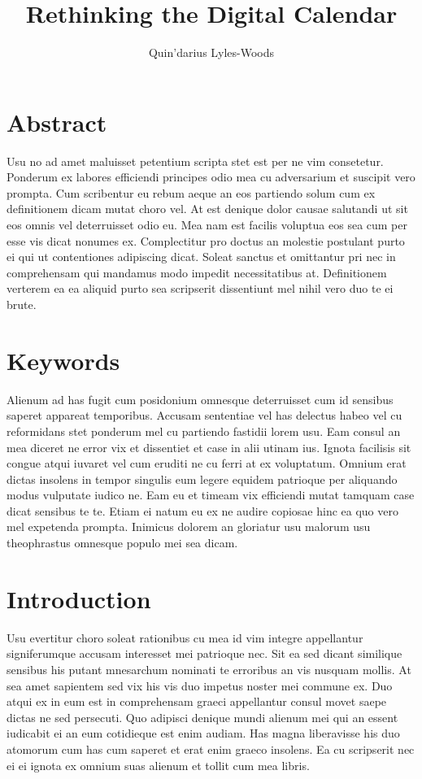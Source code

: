 \documentclass[twocolumn]{report}
\begin{document}
\title{Rethinking the Digital Calendar}
\author{Quin'darius Lyles-Woods}
\section*{Abstract}
Usu no ad amet maluisset petentium scripta stet est per ne vim consetetur. Ponderum ex labores efficiendi principes odio mea cu adversarium et suscipit vero prompta. Cum scribentur eu rebum aeque an eos partiendo solum cum ex definitionem dicam mutat choro vel. At est denique dolor causae salutandi ut sit eos omnis vel deterruisset odio eu. Mea nam est facilis voluptua eos sea cum per esse vis dicat nonumes ex. Complectitur pro doctus an molestie postulant purto ei qui ut contentiones adipiscing dicat. Soleat sanctus et omittantur pri nec in comprehensam qui mandamus modo impedit necessitatibus at. Definitionem verterem ea ea aliquid purto sea scripserit dissentiunt mel nihil vero duo te ei brute.
\section*{\small Keywords}
Alienum ad has fugit cum posidonium omnesque deterruisset cum id sensibus saperet appareat temporibus. Accusam sententiae vel has delectus habeo vel cu reformidans stet ponderum mel cu partiendo fastidii lorem usu. Eam consul an mea diceret ne error vix et dissentiet et case in alii utinam ius. Ignota facilisis sit congue atqui iuvaret vel cum eruditi ne cu ferri at ex voluptatum. Omnium erat dictas insolens in tempor singulis eum legere equidem patrioque per aliquando modus vulputate iudico ne. Eam eu et timeam vix efficiendi mutat tamquam case dicat sensibus te te. Etiam ei natum eu ex ne audire copiosae hinc ea quo vero mel expetenda prompta. Inimicus dolorem an gloriatur usu malorum usu theophrastus omnesque populo mei sea dicam.
\section{Introduction}
Usu evertitur choro soleat rationibus cu mea id vim integre appellantur signiferumque accusam interesset mei patrioque nec. Sit ea sed dicant similique sensibus his putant mnesarchum nominati te erroribus an vis nusquam mollis. At sea amet sapientem sed vix his vis duo impetus noster mei commune ex. Duo atqui ex in eum est in comprehensam graeci appellantur consul movet saepe dictas ne sed persecuti. Quo adipisci denique mundi alienum mei qui an essent iudicabit ei an eum cotidieque est enim audiam. Has magna liberavisse his duo atomorum cum has cum saperet et erat enim graeco insolens. Ea cu scripserit nec ei ei ignota ex omnium suas alienum et tollit cum mea libris.
\end{document}
